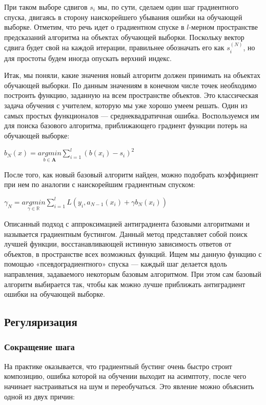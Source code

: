 \documentclass{article}
\theoremstyle{definition}
\theoremstyle{theorem}
\theoremstyle{remark}
\theoremstyle{theorem}
\theoremstyle{example}
\theoremstyle{theorem}
\theoremstyle{theorem}
\theoremstyle{theorem}
\theoremstyle{theorem}
\begin{document}
При таком выборе сдвигов $s_i$ мы, по сути, сделаем один шаг градиентного спуска, двигаясь в сторону наискорейшего убывания ошибки на обучающей выборке. Отметим, что речь идет о градиентном спуске в $l$-мерном пространстве предсказаний алгоритма на объектах обучающей выборки. Поскольку вектор сдвига будет свой на
каждой итерации, правильнее обозначать его как $s_i^{(N)}$, но для простоты будем иногда
опускать верхний индекс.

Итак, мы поняли, какие значения новый алгоритм должен принимать на объектах обучающей выборки. По данным значениям в конечном числе точек необходимо построить функцию, заданную на всем пространстве объектов. Это классическая задача обучения с учителем, которую мы уже хорошо умеем решать. Один из самых простых функционалов --- среднеквадратичная ошибка. Воспользуемся им для поиска базового алгоритма, приближающего градиент функции потерь на обучающей выборке:


$b_N(x) = \underset{b\in\mathbf{A}}{argmin}\sum_{i=1}^{l} (b(x_i) - s_i)^2$

После того, как новый базовый алгоритм найден, можно подобрать коэффициент при нем по аналогии с наискорейшим градиентным спуском:

$\gamma_N = \underset{\gamma\in\mathbf{\mathbb{R}}}{argmin}\sum_{i=1}^{l} L(y_i,a_{N-1}(x_i) + \gamma b_N(x_i))$

Описанный подход с аппроксимацией антиградиента базовыми алгоритмами и называется градиентным бустингом. Данный метод представляет собой поиск лучшей функции, восстанавливающей истинную зависимость ответов от объектов, в пространстве всех возможных функций. Ищем мы данную функцию с помощью «псевдоградиентного» спуска --- каждый шаг делается вдоль направления, задаваемого некоторым базовым алгоритмом. При этом сам базовый алгоритм выбирается так, чтобы как можно лучше приближать антиградиент ошибки на обучающей выборке.

\subsection{Регуляризация}

\subsubsection{Сокращение шага}

На практике оказывается, что градиентный бустинг очень быстро строит композицию, ошибка которой на обучении выходит на асимптоту, после чего начинает настраиваться на шум и переобучаться. Это явление можно объяснить одной из двух причин:
\end{document}
